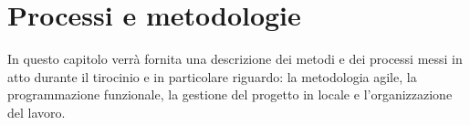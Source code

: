 
\chapter{Processi e metodologie}
\label{cap:processi-metodologie}

In questo capitolo verrà fornita una descrizione dei metodi e dei processi messi in atto durante il tirocinio e in particolare riguardo: la metodologia agile, la programmazione funzionale, la gestione del progetto in locale e l'organizzazione del lavoro.

